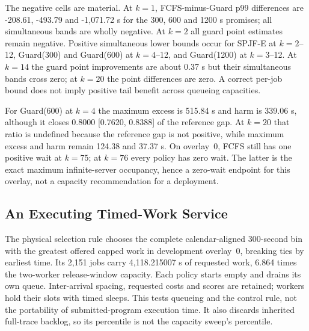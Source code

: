 \documentclass[mathematics,supfile,submit,moreauthors]{Definitions/mdpi}
\newcommand{\devnum}[1]{#1}
\begin{document}
The negative cells are material. At $k=\devnum{1}$, FCFS-minus-Guard p99 differences
are \devnum{-208.61}, \devnum{-493.79} and \devnum{-1{,}071.72} s for the
\devnum{300}, \devnum{600} and \devnum{1200} s promises; all simultaneous bands
are wholly negative. At $k=\devnum{2}$ all guard point estimates remain negative.
Positive simultaneous lower bounds occur for SPJF-E at $k=\devnum{2}$--\devnum{12},
Guard(\devnum{300}) and Guard(\devnum{600}) at $k=\devnum{4}$--\devnum{12}, and
Guard(\devnum{1200}) at $k=\devnum{3}$--\devnum{12}. At $k=\devnum{14}$ the guard
point improvements are about \devnum{0.37} s but their simultaneous bands cross
zero; at $k=\devnum{20}$ the point differences are zero. A correct per-job bound
does not imply positive tail benefit across queueing capacities.

For Guard(\devnum{600}) at $k=\devnum{4}$ the maximum excess is \devnum{515.84} s
and harm is \devnum{339.06} s, although it closes
\devnum{0.8000 [0.7620, 0.8388]} of the reference gap. At $k=\devnum{20}$ that
ratio is undefined because the reference gap is not positive, while maximum excess
and harm remain \devnum{124.38} and \devnum{37.37} s. On overlay~\devnum{0}, FCFS
still has one positive wait at $k=\devnum{75}$; at $k=\devnum{76}$ every policy has
zero wait. The latter is the exact maximum infinite-server occupancy, hence a
zero-wait endpoint for this overlay, not a capacity recommendation for a deployment.

\subsection{An Executing Timed-Work Service}

The physical selection rule chooses the complete calendar-aligned
\devnum{300}-second bin with the greatest offered capped work in development
overlay~\devnum{0}, breaking ties by earliest time. Its \devnum{2{,}151} jobs carry
\devnum{4{,}118.215007} s of requested work, \devnum{6.864} times the
two-worker release-window capacity. Each policy starts empty and drains its own
queue. Inter-arrival spacing, requested costs and scores are retained; workers hold
their slots with timed sleeps. This tests queueing and the control rule, not the
portability of submitted-program execution time. It also discards inherited
full-trace backlog, so its percentile is not the capacity sweep's percentile.
\end{document}
